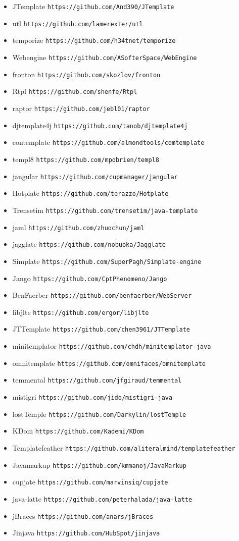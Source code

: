 \begin{singlespace}
\begin{itemize}
\item JTemplate \verb!https://github.com/And390/JTemplate!
\item utl \verb!https://github.com/lamerexter/utl!
\item temporize \verb!https://github.com/h34tnet/temporize!
\item Webengine \verb!https://github.com/ASofterSpace/WebEngine!
\item fronton \verb!https://github.com/skozlov/fronton!
\item Rtpl \verb!https://github.com/shenfe/Rtpl!
\item raptor \verb!https://github.com/jebl01/raptor!
\item djtemplate4j \verb!https://github.com/tanob/djtemplate4j!
\item contemplate \verb!https://github.com/almondtools/comtemplate!
\item templ8 \verb!https://github.com/mpobrien/templ8!
\item jangular \verb!https://github.com/cupmanager/jangular!
\item Hotplate \verb!https://github.com/terazzo/Hotplate!
\item Trensetim \verb!https://github.com/trensetim/java-template!
\item jaml \verb!https://github.com/zhuochun/jaml!
\item jagglate \verb!https://github.com/nobuoka/Jagglate!
\item Simplate \verb!https://github.com/SuperPagh/Simplate-engine!
\item Jango \verb!https://github.com/CptPhenomeno/Jango!
\item BenFaerber \verb!https://github.com/benfaerber/WebServer!
\item libjlte \verb!https://github.com/ergor/libjlte!
\item JTTemplate \verb!https://github.com/chen3961/JTTemplate!
\item minitemplator \verb!https://github.com/chdh/minitemplator-java!
\item omnitemplate \verb!https://github.com/omnifaces/omnitemplate!
\item temmental \verb!https://github.com/jfgiraud/temmental!
\item mistigri \verb!https://github.com/jido/mistigri-java!
\item lostTemple \verb!https://github.com/Darkylin/lostTemple!
\item KDom \verb!https://github.com/Kademi/KDom!
\item Templatefeather \verb!https://github.com/aliteralmind/templatefeather!
\item Javamarkup \verb!https://github.com/kmmanoj/JavaMarkup!
\item cupjate \verb!https://github.com/marvinsiq/cupjate!
\item java-latte \verb!https://github.com/peterhalada/java-latte!
\item jBraces \verb!https://github.com/anars/jBraces!
\item Jinjava \verb!https://github.com/HubSpot/jinjava!
\end{itemize}
\end{singlespace}